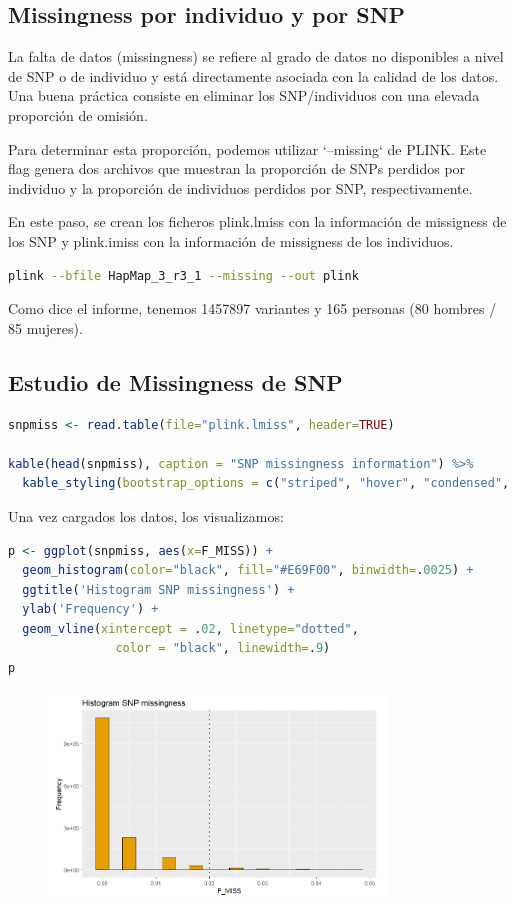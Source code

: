 \subsection{Missingness por individuo y por SNP}
La falta de datos (missingness) se refiere al grado de datos no disponibles a nivel de SNP o de individuo y está directamente asociada con la calidad de los datos. Una buena práctica consiste en eliminar los SNP/individuos con una elevada proporción de omisión.

Para determinar esta proporción, podemos utilizar `--missing` de PLINK. Este flag genera dos archivos que muestran la proporción de SNPs perdidos por individuo y la proporción de individuos perdidos por SNP, respectivamente. 

En este paso, se crean los ficheros plink.lmiss con la información de missigness de los SNP y plink.imiss con la información de missigness de los individuos.

\begin{lstlisting}[language=bash]
plink --bfile HapMap_3_r3_1 --missing --out plink
\end{lstlisting}

Como dice el informe, tenemos 1457897 variantes y 165 personas (80 hombres / 85 mujeres).

\subsection{Estudio de Missingness de SNP}

\begin{lstlisting}[language=R]
snpmiss <- read.table(file="plink.lmiss", header=TRUE)

kable(head(snpmiss), caption = "SNP missingness information") %>%
  kable_styling(bootstrap_options = c("striped", "hover", "condensed", "responsive"), full_width = FALSE) 
\end{lstlisting}

Una vez cargados los datos, los visualizamos:

\begin{lstlisting}[language=R]
p <- ggplot(snpmiss, aes(x=F_MISS)) +
  geom_histogram(color="black", fill="#E69F00", binwidth=.0025) +
  ggtitle('Histogram SNP missingness') +
  ylab('Frequency') +
  geom_vline(xintercept = .02, linetype="dotted",
               color = "black", linewidth=.9)
p 
\end{lstlisting}

\begin{figure}[htbp]
\centering
\includegraphics[width = 0.8\textwidth]{figs/hist-snpmiss.png}
\end{figure}

